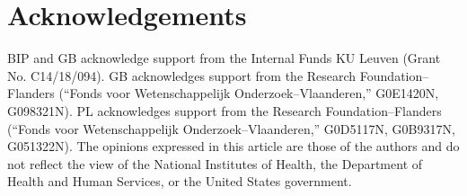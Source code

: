 \section{Acknowledgements}
BIP and GB acknowledge support from the Internal Funds KU Leuven (Grant No. C14/18/094).
GB acknowledges support from the Research Foundation--Flanders (``Fonds voor Wetenschappelijk Onderzoek--Vlaanderen,'' G0E1420N, G098321N).
PL acknowledges support from the Research Foundation--Flanders (``Fonds voor Wetenschappelijk Onderzoek--Vlaanderen,'' G0D5117N, G0B9317N, G051322N).
The opinions expressed in this article are those of the authors and do not reflect the view of the National Institutes of Health, the Department of Health and Human Services, or the United States government.


\cleardoublepage

